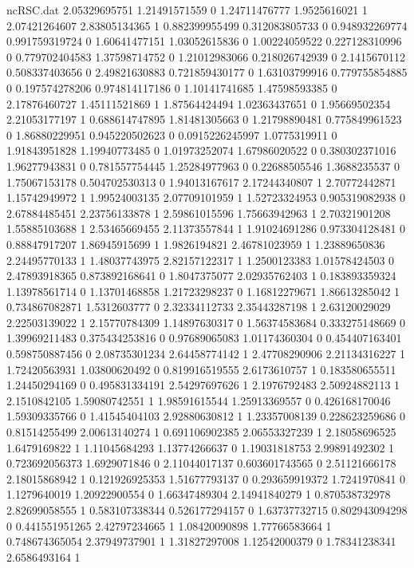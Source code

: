\begin{filecontents}{ncRSC.dat}
2.05329695751 1.21491571559 0
1.24711476777 1.9525616021 1
2.07421264607 2.83805134365 1
0.882399955499 0.312083805733 0
0.948932269774 0.991759319724 0
1.60641477151 1.03052615836 0
1.00224059522 0.227128310996 0
0.779702404583 1.37598714752 0
1.21012983066 0.218026742939 0
2.1415670112 0.508337403656 0
2.49821630883 0.721859430177 0
1.63103799916 0.779755854885 0
0.197574278206 0.974814117186 0
1.10141741685 1.47598593385 0
2.17876460727 1.45111521869 1
1.87564424494 1.02363437651 0
1.95669502354 2.21053177197 1
0.688614747895 1.81481305663 0
1.21798890481 0.775849961523 0
1.86880229951 0.945220502623 0
0.0915226245997 1.0775319911 0
1.91843951828 1.19940773485 0
1.01973252074 1.67986020522 0
0.380302371016 1.96277943831 0
0.781557754445 1.25284977963 0
0.22688505546 1.3688235537 0
1.75067153178 0.504702530313 0
1.94013167617 2.17244340807 1
2.70772442871 1.15742949972 1
1.99524003135 2.07709101959 1
1.52723324953 0.905319082938 0
2.67884485451 2.23756133878 1
2.59861015596 1.75663942963 1
2.70321901208 1.55885103688 1
2.53465669455 2.11373557844 1
1.91024691286 0.973304128481 0
0.88847917207 1.86945915699 1
1.9826194821 2.46781023959 1
1.23889650836 2.24495770133 1
1.48037743975 2.82157122317 1
1.2500123383 1.01578424503 0
2.47893918365 0.873892168641 0
1.8047375077 2.02935762403 1
0.183893359324 1.13978561714 0
1.13701468858 1.21723298237 0
1.16812279671 1.86613285042 1
0.734867082871 1.5312603777 0
2.32334112733 2.35443287198 1
2.63120029029 2.22503139022 1
2.15770784309 1.14897630317 0
1.56374583684 0.333275148669 0
1.39969211483 0.375434253816 0
0.97689065083 1.01174360304 0
0.454407163401 0.598750887456 0
2.08735301234 2.64458774142 1
2.47708290906 2.21134316227 1
1.72420563931 1.03800620492 0
0.819916519555 2.6173610757 1
0.183580655511 1.24450294169 0
0.495831334191 2.54297697626 1
2.1976792483 2.50924882113 1
2.1510842105 1.59080742551 1
1.98591615544 1.25913369557 0
0.426168170046 1.59309335766 0
1.41545404103 2.92880630812 1
1.23357008139 0.228623259686 0
0.81514255499 2.00613140274 1
0.691106902385 2.06553327239 1
2.18058696525 1.6479169822 1
1.11045684293 1.13774266637 0
1.19031818753 2.99891492302 1
0.723692056373 1.6929071846 0
2.11044017137 0.603601743565 0
2.51121666178 2.18015868942 1
0.121926925353 1.51677793137 0
0.293659919372 1.7241970841 0
1.1279640019 1.20922900554 0
1.66347489304 2.14941840279 1
0.870538732978 2.82699058555 1
0.583107338344 0.526177294157 0
1.63737732715 0.802943094298 0
0.441551951265 2.42797234665 1
1.08420090898 1.77766583664 1
0.748674365054 2.37949737901 1
1.31827297008 1.12542000379 0
1.78341238341 2.6586493164 1

\end{filecontents}
